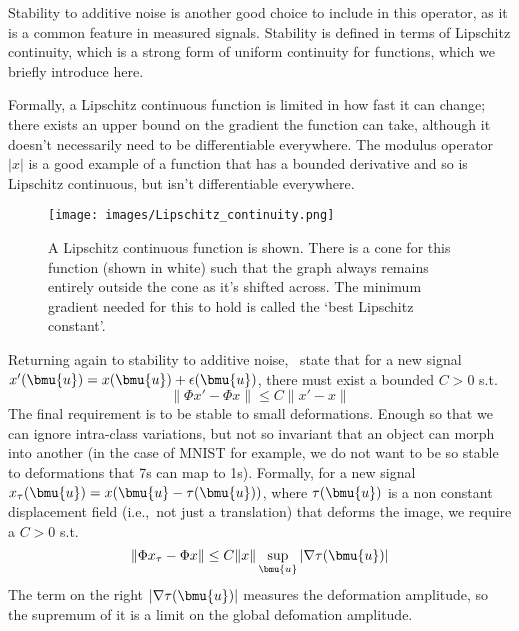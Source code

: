   Stability to additive noise is another good choice to include in this operator,
  as it is a common feature in measured signals. Stability is defined in terms of
  Lipschitz continuity, which is a strong form of uniform continuity for
  functions, which we briefly introduce here.

  Formally, a Lipschitz continuous function is limited in how fast it can change;
  there exists an upper bound on the gradient the function can take, although it
  doesn't necessarily need to be differentiable everywhere. The modulus operator
  $|x|$ is a good example of a function that has a bounded derivative and so is
  Lipschitz continuous, but isn't differentiable everywhere.

  \begin{figure}
    \begin{center}
      \texttt{[image: images/Lipschitz\_continuity.png]}
      \caption[A Lipschitz continuous function]
              {A Lipschitz continuous function is shown. There is a cone for this
              function (shown in white) such that the graph always remains entirely outside
              the cone as it's shifted across. The minimum gradient needed for this to hold
              is called the `best Lipschitz constant'.}
      \label{fig:lipschitz}
    \end{center}
  \end{figure}

  Returning again to stability to additive noise, \Bruna\ state that for a new
  signal $x'(\bmu{u}) = x(\bmu{u}) + \epsilon(\bmu{u})$, there must exist
  a bounded $C>0$ s.t.
  \begin{equation}\label{eq:scat_noise_stability}
    \|\Phi x' - \Phi x\| \leq C \|x' - x\|
  \end{equation}
  The final requirement is to be stable to small deformations. Enough so that we
  can ignore intra-class variations, but not so invariant that an object can
  morph into another (in the case of MNIST for example, we do not want to be so
  stable to deformations that 7s can map to 1s). Formally, for a new signal
  $x_{\tau}(\bmu{u}) = x(\bmu{u}-\tau(\bmu{u}))$, where $\tau(\bmu{u})$ is a non
  constant displacement field (i.e.,\ not just a translation) that deforms the
  image, we require a $C>0$ s.t.
  \protect\begin{equation}\label{eq:scat_deformation_stability}
    \|\Phi x_{\tau} - \Phi x \| \leq C \|x\| \sup_{\bmu{u}} |\nabla\tau(\bmu{u})|
  \protect\end{equation}
  The term on the right $|\nabla\tau(\bmu{u})|$ measures the deformation
  amplitude, so the supremum of it is a limit on the global defomation amplitude.

